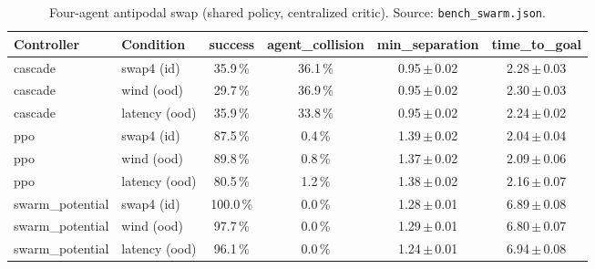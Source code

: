 \begin{table}[!htbp]\centering\small\caption{Four-agent antipodal swap (shared policy, centralized critic). Source: \texttt{bench\_swarm.json}.}\label{tab:fw_swarm}
\begin{adjustbox}{max width=\linewidth}\begin{tabular}{llcccc}\toprule
Controller & Condition & success & agent\_collision & min\_separation & time\_to\_goal\\\midrule
cascade & swap4 (id) & 35.9\,\% & 36.1\,\% & 0.95\,$\pm$\,0.02 & 2.28\,$\pm$\,0.03\\
cascade & wind (ood) & 29.7\,\% & 36.9\,\% & 0.95\,$\pm$\,0.02 & 2.30\,$\pm$\,0.03\\
cascade & latency (ood) & 35.9\,\% & 33.8\,\% & 0.95\,$\pm$\,0.02 & 2.24\,$\pm$\,0.02\\
ppo & swap4 (id) & 87.5\,\% & 0.4\,\% & 1.39\,$\pm$\,0.02 & 2.04\,$\pm$\,0.04\\
ppo & wind (ood) & 89.8\,\% & 0.8\,\% & 1.37\,$\pm$\,0.02 & 2.09\,$\pm$\,0.06\\
ppo & latency (ood) & 80.5\,\% & 1.2\,\% & 1.38\,$\pm$\,0.02 & 2.16\,$\pm$\,0.07\\
swarm\_potential & swap4 (id) & 100.0\,\% & 0.0\,\% & 1.28\,$\pm$\,0.01 & 6.89\,$\pm$\,0.08\\
swarm\_potential & wind (ood) & 97.7\,\% & 0.0\,\% & 1.29\,$\pm$\,0.01 & 6.80\,$\pm$\,0.07\\
swarm\_potential & latency (ood) & 96.1\,\% & 0.0\,\% & 1.24\,$\pm$\,0.01 & 6.94\,$\pm$\,0.08\\
\bottomrule\end{tabular}\end{adjustbox}
\end{table}


